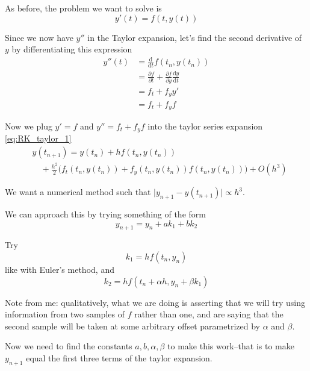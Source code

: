 \documentclass[12pt,letterpaper]{article}
\newcommand{\dd}{\mathrm{d}}
\begin{document}
As before, the problem we want to solve is
\begin{equation}
	y'(t) = f(t, y(t))
\end{equation}

Since we now have $y''$ in the Taylor expansion, let's find the second derivative of $y$ by differentiating this expression
\begin{align}
	y''(t) &= \frac{\dd}{\dd t} f(t_n, y(t_n)) \\
	&= \frac{\partial f}{\partial t} + \frac{\partial f}{\partial y} \frac{\dd y}{\dd t} \\
	&= f_t + f_y y' \\
	&= f_t + f_y f
\end{align}

Now we plug $y'=f$ and $y''=f_t + f_y f$ into the taylor series expansion \ref{eq:RK_taylor_1}
\begin{align}
	& y(t_{n+1}) = y(t_n) + h f(t_n, y(t_n)) \nonumber \\
	&\quad + \frac{h^2}{2}\bigg( f_t(t_n, y(t_n)) + f_y(t_n, y(t_n)) f(t_n, y(t_n)) \bigg) + O(h^3) \label{eq:RK_taylor_2}
\end{align}

We want a numerical method such that $\lvert y_{n+1} - y(t_{n+1}) \rvert \propto h^3$.

We can approach this by trying something of the form
\begin{equation} \label{eq:method_pre}
	y_{n+1} = y_n + ak_1 + bk_2
\end{equation}

Try
\begin{equation}
	k_1 = hf(t_n, y_n)
\end{equation}
like with Euler's method, and
\begin{equation}
	k_2 = hf(t_n + \alpha h, y_n + \beta k_1)
\end{equation}

Note from me: qualitatively, what we are doing is asserting that we will try using information from two samples of $f$ rather than one, and are saying that the second sample will be taken at some arbitrary offset parametrized by $\alpha$ and $\beta$.

Now we need to find the constants $a, b, \alpha, \beta$ to make this work--that is to make $y_{n+1}$ equal the first three terms of the taylor expansion.
\end{document}
